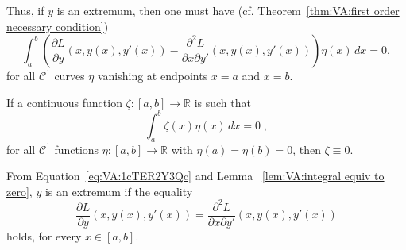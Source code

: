 Thus, if $y$ is an extremum, then one must have (cf. 
Theorem~\ref{thm:VA:first order necessary condition})
\begin{equation}\label{eq:VA:1cTER2Y3Qc}
	\int_a^b\left(\dfrac{\partial L}{\partial y}(x,
	y(x),y'(x))-\dfrac{\partial^2 L}{\partial x\partial y'}(x,
	y(x),y'(x))\right)\eta(x)\,dx=0,
\end{equation}
for all $\mathcal{C}^1$ curves $\eta$ vanishing at endpoints $x=a$ and 
$x=b$.

\begin{lemma}\label{lem:VA:integral equiv to zero}
	If a continuous function $\zeta:[a,b]\to\mathbb{R}$ is such that
	\[\int_a^b \zeta(x)\eta(x)\,dx=0\;,\]
	for all $\mathcal{C}^1$ functions $\eta:[a,b]\to\mathbb{R}$ with 
	$\eta(a)=\eta(b)=0$, then $\zeta\equiv0$.
\end{lemma}

From Equation~\eqref{eq:VA:1cTER2Y3Qc} and Lemma~
\eqref{lem:VA:integral equiv to zero}, $y$ is an extremum if the equality
\begin{equation}\tag{Euler-Lagrange}\label{eq:Euler-Lagrange}
	\dfrac{\partial L}{\partial y}(x,
	y(x),y'(x))=\dfrac{\partial^2 L}{\partial x\partial y'}(x,
	y(x),y'(x))
\end{equation}
holds, for every $x\in[a,b]$.